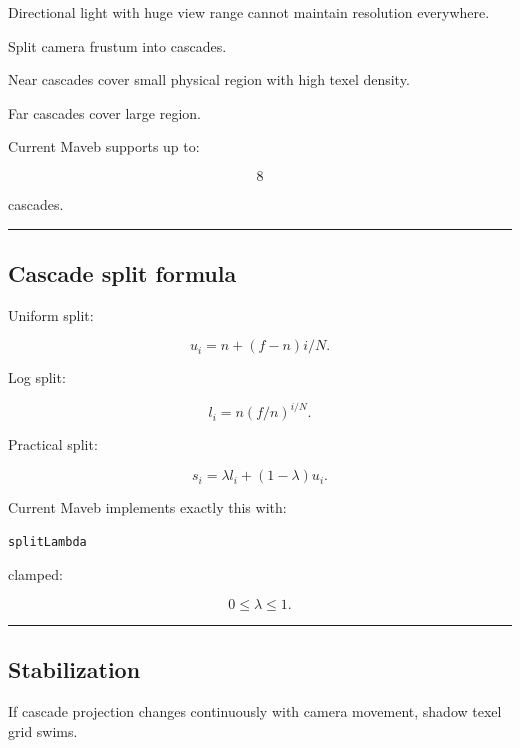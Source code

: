 \hypertarget{04-visual-computing-ii-ch040-cascaded-shadow-maps}{}

Directional light with huge view range cannot maintain resolution everywhere.

Split camera frustum into cascades.

Near cascades cover small physical region with high texel density.

Far cascades cover large region.

Current Maveb supports up to:

\[
8
\]

cascades.

\begin{center}\rule{0.5\linewidth}{0.5pt}\end{center}

\subsection{Cascade split formula}\label{04-visual-computing-ii-ch040-cascade-split-formula}

\hypertarget{04-visual-computing-ii-ch040-cascade-split-formula}{}

Uniform split:

\[
u_i=
n+(f-n)i/N.
\]

Log split:

\[
l_i=
n(f/n)^{i/N}.
\]

Practical split:

\[
\boxed{
s_i=
\lambda l_i+
(1-\lambda)u_i.
}
\]

Current Maveb implements exactly this with:

\begin{verbatim}
splitLambda
\end{verbatim}

clamped:

\[
0\le\lambda\le1.
\]

\begin{center}\rule{0.5\linewidth}{0.5pt}\end{center}

\subsection{Stabilization}\label{04-visual-computing-ii-ch040-stabilization}

\hypertarget{04-visual-computing-ii-ch040-stabilization}{}

If cascade projection changes continuously with camera movement, shadow texel grid swims.

